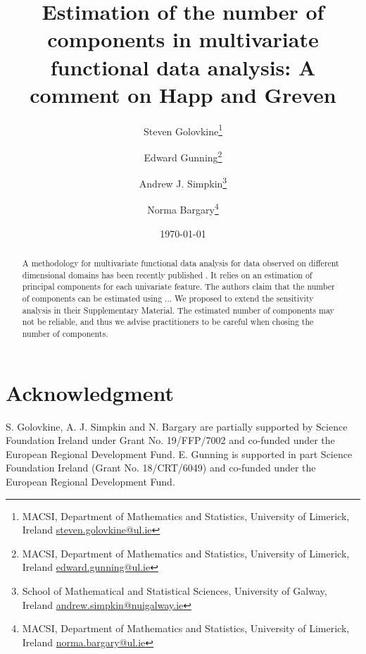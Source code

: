 \documentclass{article}
\title{Estimation of the number of components in multivariate functional data analysis: A comment on Happ and Greven}
\author{%
Steven Golovkine\thanks{MACSI, Department of Mathematics and Statistics, University of Limerick, Ireland \href{mailto:steven.golovkine@ul.ie}{steven.golovkine@ul.ie}}
\and
Edward Gunning\thanks{MACSI, Department of Mathematics and Statistics, University of Limerick, Ireland \href{mailto:edward.gunning@ul.ie}{edward.gunning@ul.ie}}
\and
Andrew J. Simpkin\thanks{School of Mathematical and Statistical Sciences, University of Galway, Ireland \href{mailto:andrew.simpkin@nuigalway.ie}{andrew.simpkin@nuigalway.ie}}
\and
Norma Bargary\thanks{MACSI, Department of Mathematics and Statistics, University of Limerick, Ireland \href{mailto:norma.bargary@ul.ie}{norma.bargary@ul.ie}}
}
\date{\today}
\newcounter{th}
\begin{document}
\maketitle

\begin{abstract}
A methodology for multivariate functional data analysis for data observed on different dimensional domains has been recently published \cite{happMultivariateFunctionalPrincipal2018a}. It relies on an estimation of principal components for each univariate feature. The authors claim that the number of components can be estimated using ... We proposed to extend the sensitivity analysis in their Supplementary Material. The estimated number of components may not be reliable, and thus we advise practitioners to be careful when chosing the number of components.
\end{abstract}



% 

% 

\section*{Acknowledgment}

S. Golovkine, A. J. Simpkin and N. Bargary are partially supported by Science Foundation Ireland under Grant No. 19/FFP/7002 and co-funded under the European Regional Development Fund. E. Gunning is supported in part Science Foundation Ireland (Grant No. 18/CRT/6049) and co-funded under the European Regional Development Fund.



\end{document}
